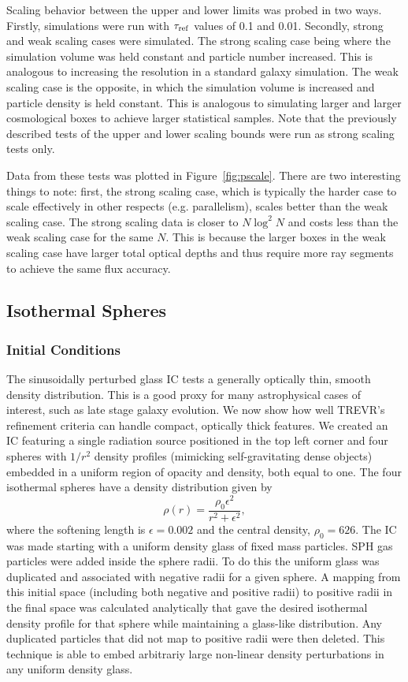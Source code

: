 \documentclass[fleq,usenatbib]{mnras}
\newcommand{\acro}{TREVR}
\newcommand{\tr}{\tau_{\rm ref}}
\begin{document}
{Scaling behavior between the upper and lower limits was probed in two ways. 
Firstly, simulations were run with $\tr$ values of 0.1 and 0.01. Secondly, 
strong and weak scaling cases were simulated. The strong scaling case being 
where the simulation volume was held constant and particle number increased. 
This is analogous to increasing the resolution in a standard galaxy 
simulation. The weak scaling case is the opposite, in which the simulation 
volume is increased and particle density is held constant. This is analogous 
to simulating larger and larger cosmological boxes to achieve larger 
statistical samples. Note that the previously described tests of the upper and 
lower scaling bounds were run as strong scaling tests only.

Data from these tests was plotted in Figure~\ref{fig:pscale}. 
There are two interesting things to note: first, the strong scaling case, 
which is typically the harder case to scale effectively in other respects (e.g. parallelism),
scales better than 
the weak scaling case.  The strong scaling data is closer to
$N\log^2{N}$ and costs less than the weak scaling case for the same $N$. This is 
because the larger boxes in the weak scaling case have larger total
optical depths and thus require more ray segments to achieve the same flux accuracy.

\subsection{Isothermal Spheres}\label{spheretest}
\subsubsection{Initial Conditions}
The sinusoidally perturbed glass IC tests a generally optically thin, smooth 
density distribution. This is a good proxy for many astrophysical cases of 
interest, such as late stage galaxy evolution.  We now show how well \acro{}'s 
refinement criteria can handle compact, optically thick features.   We created 
an IC featuring a single radiation source positioned in the top left corner 
and four spheres with $1/r^2$ density profiles (mimicking self-gravitating dense objects)
embedded in a uniform region of opacity and density, both equal to one.
The four isothermal spheres have a 
density distribution given by
\begin{equation}
\rho(r) = \frac{\rho_0 \epsilon^2}{r^2 + \epsilon^2},
\end{equation}
where the softening length is $\epsilon=0.002$ and the central density, 
$\rho_0=626$.  The IC was made starting with a uniform density glass of fixed mass particles.
SPH gas particles were added inside the sphere radii.
To do this the uniform glass was duplicated and associated with negative radii for a given sphere.
A mapping from this initial space (including both negative and positive radii) to positive
radii in the final space was calculated analytically
that gave the desired isothermal density profile for that sphere
while maintaining a glass-like distribution.
Any duplicated particles that did not map to positive radii were then deleted.
This technique is able to embed arbitrariy large non-linear density
perturbations in any uniform density glass.

}
\end{document}
